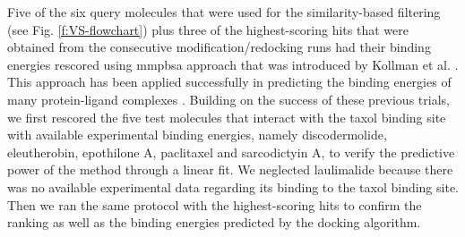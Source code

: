 \documentclass[11pt]{report}
\begin{document}
Five of the six query molecules that were used for the similarity-based filtering (see Fig. 
\ref{f:VS-flowchart}) plus three of the highest-scoring hits that were obtained from the consecutive modification/redocking runs had their binding energies rescored using \gls{mmpbsa} approach that was introduced by Kollman et al.
\cite{Kollman2000}. 
This approach has been applied successfully in predicting the binding energies of many protein-ligand complexes 
\cite{Wang2001,Barakat2010,Lepsik2004,Brown2006,Hou2007}. 
Building on the success of these previous trials, we first rescored the five test molecules that interact with the taxol binding site with available experimental binding energies, namely discodermolide, eleutherobin, epothilone A, paclitaxel and sarcodictyin A, to verify the predictive power of the method through a linear fit. We neglected laulimalide because there was no available experimental data regarding its binding to the taxol binding site. Then we ran the same protocol with the highest-scoring hits to confirm the ranking as well as the binding energies
predicted by the docking algorithm.
\end{document}

